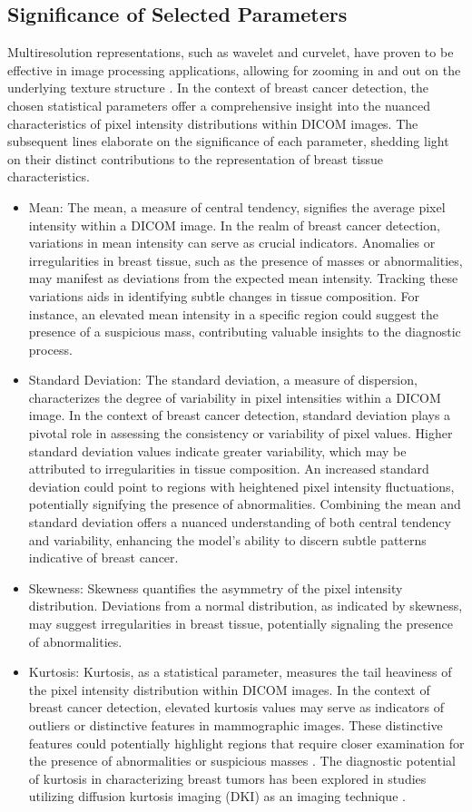 \subsection{Significance of Selected Parameters}
Multiresolution representations, such as wavelet and curvelet, have proven to be effective in image processing applications, allowing for zooming in and out on the underlying texture structure \cite{MESELHYELTOUKHY2012123}. In the context of breast cancer detection, the chosen statistical parameters offer a comprehensive insight into the nuanced characteristics of pixel intensity distributions within DICOM images. The subsequent lines elaborate on the significance of each parameter, shedding light on their distinct contributions to the representation of breast tissue characteristics.
\begin{itemize}
  \item Mean: The mean, a measure of central tendency, signifies the average pixel intensity within a DICOM image. In the realm of breast cancer detection, variations in mean intensity can serve as crucial indicators. Anomalies or irregularities in breast tissue, such as the presence of masses or abnormalities, may manifest as deviations from the expected mean intensity. Tracking these variations aids in identifying subtle changes in tissue composition. For instance, an elevated mean intensity in a specific region could suggest the presence of a suspicious mass, contributing valuable insights to the diagnostic process.
  \item Standard Deviation: The standard deviation, a measure of dispersion, characterizes the degree of variability in pixel intensities within a DICOM image. In the context of breast cancer detection, standard deviation plays a pivotal role in assessing the consistency or variability of pixel values. Higher standard deviation values indicate greater variability, which may be attributed to irregularities in tissue composition. An increased standard deviation could point to regions with heightened pixel intensity fluctuations, potentially signifying the presence of abnormalities. Combining the mean and standard deviation offers a nuanced understanding of both central tendency and variability, enhancing the model's ability to discern subtle patterns indicative of breast cancer.
  \item Skewness: Skewness quantifies the asymmetry of the pixel intensity distribution. Deviations from a normal distribution, as indicated by skewness, may suggest irregularities in breast tissue, potentially signaling the presence of abnormalities.
  \item Kurtosis: Kurtosis, as a statistical parameter, measures the tail heaviness of the pixel intensity distribution within DICOM images. In the context of breast cancer detection, elevated kurtosis values may serve as indicators of outliers or distinctive features in mammographic images. These distinctive features could potentially highlight regions that require closer examination for the presence of abnormalities or suspicious masses \cite{li2020diagnostic}. The diagnostic potential of kurtosis in characterizing breast tumors has been explored in studies utilizing diffusion kurtosis imaging (DKI) as an imaging technique \cite{li2020diagnostic}.
\end{itemize}
